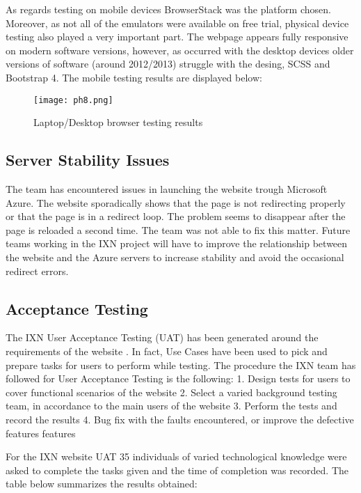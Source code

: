 As regards testing on mobile devices BrowserStack was the platform
chosen. Moreover, as not all of the emulators were available on free
trial, physical device testing also played a very important part. The
webpage appears fully responsive on modern software versions, however,
as occurred with the desktop devices older versions of software (around
2012/2013) struggle with the desing, SCSS and Bootstrap 4. The mobile
testing results are displayed below:

\begin{figure}[H]
      \centering
      \texttt{[image: ph8.png]}
      \caption{Laptop/Desktop browser testing results}
 \end{figure}

\hypertarget{server-stability-issues}{%
\subsection{Server Stability Issues}\label{server-stability-issues}}

The team has encountered issues in launching the website trough
Microsoft Azure. The website sporadically shows that the page is not
redirecting properly or that the page is in a redirect loop. The problem
seems to disappear after the page is reloaded a second time. The team
was not able to fix this matter. Future teams working in the IXN project
will have to improve the relationship between the website and the Azure
servers to increase stability and avoid the occasional redirect errors.

\hypertarget{acceptance-testing}{%
\subsection{Acceptance Testing}\label{acceptance-testing}}

The IXN User Acceptance Testing (UAT) has been generated around the
requirements of the website \cite{g7} . In fact, Use Cases have been
used to pick and prepare tasks for users to perform while testing. The
procedure the IXN team has followed for User Acceptance Testing is the
following: 1. Design tests for users to cover functional scenarios of
the website 2. Select a varied background testing team, in accordance to
the main users of the website 3. Perform the tests and record the
results 4. Bug fix with the faults encountered, or improve the defective
features features

For the IXN website UAT 35 individuals of varied technological knowledge
were asked to complete the tasks given and the time of completion was
recorded. The table below summarizes the results obtained:

